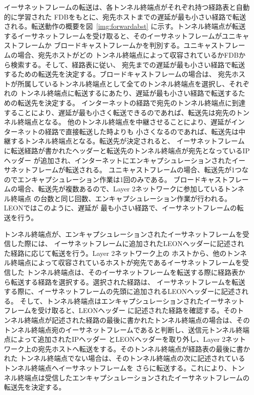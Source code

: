 イーサネットフレームの転送は、各トンネル終端点がそれぞれ持つ経路表と自動的に学習された
FDBをもとに、宛先ホストまでの遅延が最も小さい経路で転送される。転送動作の概要を図~\ref{img:forwardabst}
に示す。トンネル終端点が転送
するイーサネットフレームを受け取ると、そのイーサネットフレームがユニキャストフレームか
ブロードキャストフレームかを判別する。ユニキャストフレームの場合、宛先ホストがどの
トンネル終端点によって収容されているかFDBから検索する。そして、経路表に従い、
宛先までの遅延が最も小さい経路で転送するための転送先を決定する。ブロードキャストフレームの場合は、
宛先ホストが所属しているトンネル終端点として全てのトンネル終端点を選択し、それぞれの
トンネル終端点に転送するにあたり、遅延が最も小さい経路で転送するための転送先を決定する。
インターネットの経路で宛先のトンネル終端点に到達することにより、遅延が最も小さく転送できるのであれば、転送先は宛先のトンネル終端点となる。
他のトンネル終端点を中継させることにより、遅延がインターネットの経路で直接転送した時よりも
小さくなるのであれば、転送先は中継するトンネル終端点となる。転送先が決定されると、
イーサネットフレームに転送経路が書かれたヘッダーと転送先のトンネル終端点が宛先となっているIPヘッダー
が追加され、インターネットにエンキャプシュレーションされたイーサネットフレームが転送される。
ユニキャストフレームの場合、転送先が1つなのでエンキャプシュレーション作業は1回のみである。
ブロードキャストフレームの場合、転送先が複数あるので、Layer 2ネットワークに参加しているトンネル終端点
の台数と同じ回数、エンキャプシュレーション作業が行われる。LEONではこのように、遅延が
最も小さい経路で、イーサネットフレームの転送を行う。

トンネル終端点が、エンキャプシュレーションされたイーサネットフレームを受信した際には、
イーサネットフレームに追加されたLEONヘッダーに記述された経路に応じて転送を行う。Layer 2ネットワーク上の
ホストから、他のトンネル終端点によって収容されているホストが宛先であるイーサネットフレームを受信した
トンネル終端点は、そのイーサネットフレームを転送する際に経路表から転送する経路を選択する。選択された経路は、
イーサネットフレームを転送する際に、イーサネットフレームの先頭に追加されるLEONヘッダーに記述される。
そして、トンネル終端点はエンキャプシュレーションされたイーサネットフレームを受け取ると、LEONヘッダー
に記述された経路を確認する。そのトンネル終端点が記述された経路の最後に書かれたトンネル終端点の場合は、その
トンネル終端点宛のイーサネットフレームであると判断し、送信元トンネル終端点によって追加されたIPヘッダー
とLEONヘッダーを取り外し、Layer 2ネットワーク上の宛先ホストへ転送をする。そのトンネル終端点が経路表の最後に書かれた
トンネル終端点でない場合は、そのトンネル終端点の次に記述されているトンネル終端点へイーサネットフレームを
さらに転送する。これにより、トンネル終端点は受信したエンキャプシュレーションされたイーサネットフレームの
転送先を決定する。

